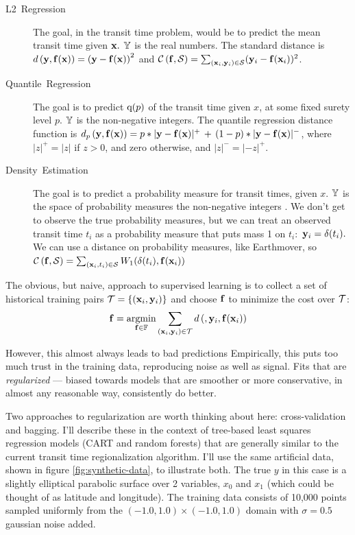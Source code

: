\documentclass[11pt,openany,american,usenames,dvipsnames,svgnames,x11names,table,isodate]{article}
\numberwithin{equation}{section}
\numberwithin{figure}{section}
\DeclareMathOperator*{\argmin}{argmin}
\begin{document}
\begin{description}
\item [{L2~Regression}] \label{des:L2Regression-The-goal,}The goal, in
the transit time problem, would be to predict the mean transit time
given ${\mathbf x}.$ $\mathbb{Y}$ is the real numbers. The standard distance
is $d\left({\mathbf y},{\mathbf f}({\mathbf x})\right)=\left({\mathbf y}-{\mathbf f}({\mathbf x})\right)^{2}$ and
$\mathcal{C}\left({\mathbf f},\mathcal{S}\right)=\sum_{({\mathbf x}_{i},{\mathbf y}_{i})\in\mathcal{S}}({\mathbf y}_{i}-{\mathbf f}({\mathbf x}_{i}))^{2}$.
\item [{Quantile~Regression}] \label{des:QuantileRegression-The-goal}The
goal is to predict $\text{q}(p)$ of the transit time given $x$,
at some fixed surety level $p.$ $\mathbb{Y}$ is the non-negative integers.
The quantile regression distance function is
$d_{p}\left({\mathbf y},{\mathbf f}({\mathbf x})\right)=p*|{\mathbf y}-{\mathbf f}({\mathbf x})|^{+}\,+\,(1-p)*|{\mathbf y}-{\mathbf f}({\mathbf x})|^{-}$,
where $|z|^{+}=|z|$ if $z>0$, and zero otherwise, and $|z|^{-}=|-z|^{+}.$
\item [{Density~Estimation}] \label{des:DensityEstimation-The-goal}The
goal is to predict a probability measure for transit times, given
$x.$ $\mathbb{Y}$ is the space of probability measures the non-negative
integers . We don't get to observe the true probability measures,
but we can treat an observed transit time $t_{i}$ as a probability
measure that puts mass 1 on $t_{i}:$ ${\mathbf y}_{i}=\delta(t_{i}).$ We
can use a distance on probability measures, like 
Earthmover\cite{levina-bickel-2001,rubner-tomasi-guibas-1998a,rubner-tomasi-guibas-1998b},
so $\mathcal{C}\left({\mathbf f},\mathcal{S}\right)=\sum_{({\mathbf x}_{i},t_{i})\in\mathcal{S}}W_{1}(\delta(t_{i}),{\mathbf f}({\mathbf x}_{i}))$
\end{description}
The obvious, but naive, approach to supervised learning is to collect
a set of historical training pairs $\mathcal{T}=\left\{ ({\mathbf x}_{i},{\mathbf y}_{i})\right\} $
and choose ${\mathbf f}$ to minimize the cost over $\mathcal{T}$: 
\begin{equation}
\f=\argmin_{\f\in\Fspace}\sum_{(\x_{i},\y_{i})\in\Tset}d\left(,\y_{i},\f(\x_{i})\right)
\end{equation}

However, this almost always leads to bad predictions Empirically,
this puts too much trust in the training data, reproducing noise as
well as signal. Fits that are \textit{regularized} --- biased towards
models that are smoother or more conservative, in almost any reasonable
way, consistently do better. 

Two approaches to regularization are worth thinking about here: cross-validation
and bagging. I'll describe these in the context of tree-based least
squares regression models (CART and random forests) that are generally
similar to the current transit time regionalization algorithm. I'll
use the same artificial data, shown in figure \ref{fig:synthetic-data},
to illustrate both. The true $y$ in this case is a slightly elliptical
parabolic surface over 2 variables, $x_{0}$ and $x_{1}$ (which could
be thought of as latitude and longitude). The training data consists
of 10,000 points sampled uniformly from the $(-1.0,1.0)\times(-1.0,1.0)$
domain with $\sigma=0.5$ gaussian noise added. 
\end{document}
